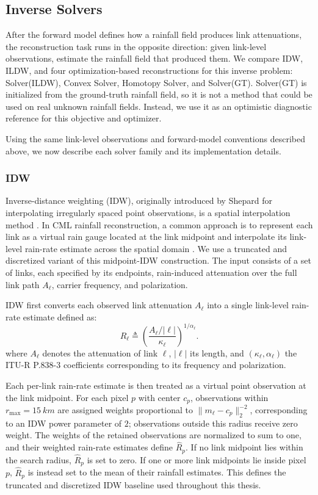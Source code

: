\documentclass[11pt]{article}
\begin{document}
\subsection{Inverse Solvers}
After the forward model defines how a rainfall field produces link attenuations, the reconstruction task runs in the opposite direction: given link-level observations, estimate the rainfall field that produced them. We compare IDW, ILDW, and four optimization-based reconstructions for this inverse problem: Solver(ILDW), Convex Solver, Homotopy Solver, and Solver(GT). Solver(GT) is initialized from the ground-truth rainfall field, so it is not a method that could be used on real unknown rainfall fields. Instead, we use it as an optimistic diagnostic reference for this objective and optimizer.

Using the same link-level observations and forward-model conventions described above, we now describe each solver family and its implementation details.
\subsubsection{IDW}
Inverse-distance weighting (IDW), originally introduced by Shepard for interpolating irregularly spaced point observations, is a spatial interpolation method \citep{shepard1968idw}. In CML rainfall reconstruction, a common approach is to represent each link as a virtual rain gauge located at the link midpoint and interpolate its link-level rain-rate estimate across the spatial domain \citep{eshel2020idw}. We use a truncated and discretized variant of this midpoint-IDW construction. The input consists of a set of links, each specified by its endpoints, rain-induced attenuation over the full link path $A_\ell$, carrier frequency, and polarization.

IDW first converts each observed link attenuation $A_\ell$ into a single link-level rain-rate estimate defined as:
\[
R_\ell \triangleq \left(\frac{A_\ell/|\ell|}{\kappa_\ell}\right)^{1/\alpha_\ell}.
\]
where $A_\ell$ denotes the attenuation of link $\ell$, $|\ell|$ its length, and $(\kappa_\ell,\alpha_\ell)$ the ITU-R P.838-3 coefficients corresponding to its frequency and polarization.

Each per-link rain-rate estimate is then treated as a virtual point observation at the link midpoint. For each pixel $p$ with center $c_p$, observations within $r_{\max}=\SI{15}{km}$ are assigned weights proportional to $\|m_\ell-c_p\|_2^{-2}$, corresponding to an IDW power parameter of $2$; observations outside this radius receive zero weight. The weights of the retained observations are normalized to sum to one, and their weighted rain-rate estimates define $\hat R_p$. If no link midpoint lies within the search radius, $\hat R_p$ is set to zero. If one or more link midpoints lie inside pixel $p$, $\hat R_p$ is instead set to the mean of their rainfall estimates. This defines the truncated and discretized IDW baseline used throughout this thesis.
\end{document}

